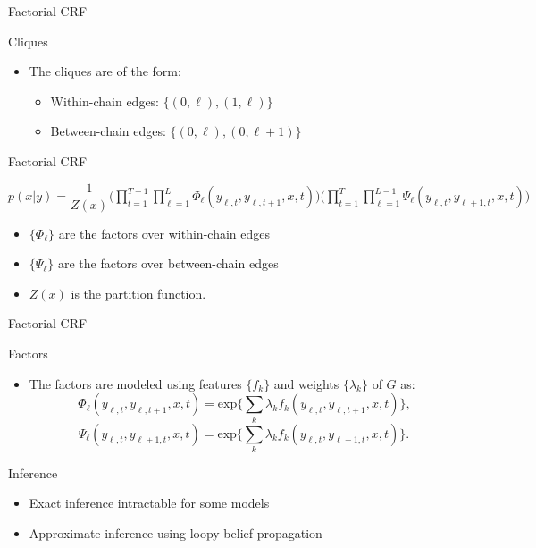 \documentclass[presentation,bigger]{beamer}
\begin{document}
\begin{frame}[label={sec:orgheadline15}]{Factorial CRF}
\begin{block}{Cliques}
\begin{itemize}
\item The cliques are of the form:
\begin{itemize}
\item Within-chain edges: \text{ }\text{ }\(\{(0,\ell),(1,\ell)\}\)
\item Between-chain edges: \(\{(0,\ell),(0,\ell+1)\}\)
\end{itemize}
\end{itemize}
\end{block}
\end{frame}
\begin{frame}[label={sec:orgheadline16}]{Factorial CRF}
\begin{definition}
\(p(x|y) = \dfrac{1}{Z(x)}\Bigg(\displaystyle\prod_{t=1}^{T-1}\prod_{\ell=1}^{L}\Phi_\ell(y_{\ell,t},y_{\ell,t+1},x,t)\Bigg)\Bigg(\prod_{t=1}^{T}\prod_{\ell=1}^{L-1}\Psi_\ell(y_{\ell,t},y_{\ell+1,t},x,t)\Bigg)\)
\begin{itemize}
\item \(\{\Phi_\ell\}\) are the factors over within-chain edges
\item \(\{\Psi_\ell\}\) are the factors over between-chain edges
\item \(Z(x)\) is the partition function.
\end{itemize}
\end{definition}
\end{frame}
\begin{frame}[label={sec:orgheadline17}]{Factorial CRF}
\begin{block}{Factors}
\begin{itemize}
\item The factors are modeled using features \(\{f_k\}\) and weights \(\{\lambda_k\}\) of \(G\) as:
\[\Phi_\ell(y_{\ell,t},y_{\ell,t+1},x,t) = \text{exp}\Bigg\{\sum_k\lambda_k f_k(y_{\ell,t},y_{\ell,t+1},x,t)\Bigg\}\text{,}\]
\[\Psi_\ell(y_{\ell,t},y_{\ell+1,t},x,t) = \text{exp}\Bigg\{\sum_k\lambda_k f_k(y_{\ell,t},y_{\ell+1,t},x,t)\Bigg\}\text{.}\]
\end{itemize}
\end{block}
\end{frame}
\begin{frame}[label={sec:orgheadline18}]{Inference}
\begin{itemize}
\item Exact inference intractable for some models
\item Approximate inference using loopy belief propagation
\end{itemize}
\end{frame}
\end{document}
